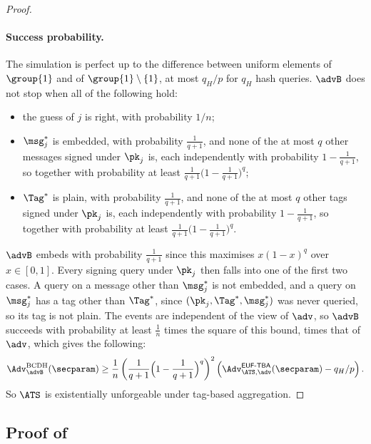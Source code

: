 \begin{proof}
  \paragraph{Success probability.} The simulation is perfect up to the
difference between uniform elements of $\group{1}$ and of $\group{1} \setminus
\{1\}$, at most $q_H/p$ for $q_H$ hash queries.
$\advB$ does not stop when all of the following
hold:
  \begin{itemize}
    \item the guess of $j$ is right, with probability $1/n$;
    \item $\msg^*_j$ is embedded, with probability $\frac{1}{q+1}$, and none of
the at most $q$ other messages signed under $\pk_j$ is, each independently with
probability $1-\frac{1}{q+1}$, so together with probability at least
$\frac{1}{q+1}\big(1-\frac{1}{q+1}\big)^q$;
    \item $\Tag^*$ is plain, with probability $\frac{1}{q+1}$, and none of the at
most $q$ other tags signed under $\pk_j$ is, each independently with probability
$1-\frac{1}{q+1}$, so together with probability at least
$\frac{1}{q+1}\big(1-\frac{1}{q+1}\big)^q$.
  \end{itemize}
$\advB$ embeds with probability $\frac{1}{q+1}$ since this maximises
$x(1-x)^q$ over $x \in [0, 1]$.
Every signing query under $\pk_j$ then falls into one of the first two cases. A
query on a message other than $\msg^*_j$ is not embedded, and a query on
$\msg^*_j$ has a tag other than $\Tag^*$, since $(\pk_j, \Tag^*, \msg^*_j)$ was
never queried, so its tag is not plain. The events are independent of the view
of $\adv$, so $\advB$ succeeds with probability at least $\frac{1}{n}$ times
the square of this bound, times that of $\adv$, which gives the following:
%
\begin{equation*}
  \Adv^{\text{BCDH}}_{\advB}(\secparam) \geq \frac{1}{n}
\left(\frac{1}{q+1}\Big(1-\frac{1}{q+1}\Big)^q\right)^2
\left(\Adv^{\mathsf{EUF\text{-}TBA}}_{\ATS,\adv}(\secparam) - q_H/p\right).
\end{equation*}
%
So $\ATS$ is existentially unforgeable under tag-based aggregation.

\end{proof}


\subsection{Proof of }\label{sec:agg-creds-proof-lemma}

